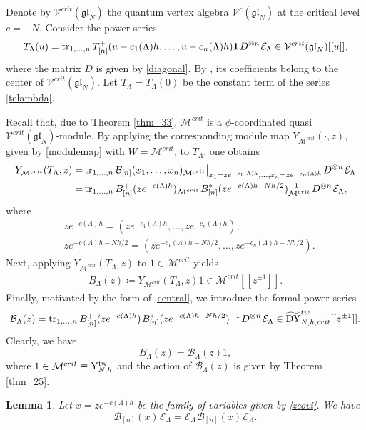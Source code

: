 \documentclass[12pt,a4paper,reqno]{amsart}
\theoremstyle{stil}
\theoremstyle{defi}
\theoremstyle{defi}
\theoremstyle{stil}
\theoremstyle{stil}
\newtheorem{lem}[thm]{Lemma}
\theoremstyle{stil}
\theoremstyle{prim}
\newcommand{\non}{\nonumber}
\newcommand{\beq}{\begin{equation}}
\newcommand{\eeq}{\end{equation}}
\newcommand{\ot}{\otimes}
\newcommand{\ts}{\hspace{1pt}}
\newcommand{\yhg}{{\rm Y}_{N,h}^{\text{tw}} }
\newcommand{\dyhocritt}{\widetilde{{\rm DY}}_{N,h,crit}^{tw} }
\newcommand{\Mccrit}{\mathcal{M}^{crit} }
\newcommand{\vac}{ \mathrm{\boldsymbol{1}}}
\newcommand{\Ec}{\mathcal{E}}
\newcommand{\tr}{ {\rm tr}}
\newcommand{\Vcdva}{\mathcal{V}^{c}(\mathfrak{gl}_N)}
\newcommand{\Vccrit}{\mathcal{V}^{crit}(\mathfrak{gl}_N)}
\newcommand{\bc}{\mathcal{B}}
\begin{document}
Denote by $\Vccrit$ the quantum   vertex algebra $\Vcdva$ at the critical level $c=-N$.
Consider the   power series
\beq\label{telambda}
T_\Lambda(u)=\tr_{1,\ldots ,n} \, T_{[n]}^+ (u -c_1(\Lambda)h,\ldots ,u -c_n(\Lambda)h)\vac \ts D^{\ot n}\ts \Ec_\Lambda \in \Vccrit[[u]],
\eeq
where the matrix $D$ is given by \eqref {diagonal}.
By \cite[Prop. 7.4]{BJK}, its coefficients belong to the center of $\Vccrit$. Let $T_\Lambda=T_\Lambda(0)$ be the constant term  of the series \eqref{telambda}.

Recall that, due to  Theorem \ref{thm_33}, $\Mccrit$ is a $\phi$-coordinated quasi $\Vccrit$-module. By applying the corresponding module map  $Y_{\Mccrit}(\cdot, z)$,  given by \eqref{modulemap} with $W=\Mccrit$,  to $T_\Lambda$, one obtains
\begin{align} 
 Y_{\Mccrit}(T_\Lambda , z) =  &\, \tr_{1,\ldots ,n} \, \bc_{[n]}(x_1, \ldots ,x_n )_{\Mccrit}\big|_{x_1=ze^{-c_1(\Lambda)h},\ldots ,x_n=ze^{-c_n(\Lambda)h}} \ts D^{\ot n}\ts \Ec_\Lambda\non\\
 = & \, \tr_{1,\ldots ,n} \, B^+_{[n]}(ze^{-c(\Lambda)h})_{\Mccrit} \ts B^*_{[n]}(ze^{-c(\Lambda)h -Nh/2})_{\Mccrit}^{-1}\ts D^{\ot n}\ts \Ec_\Lambda,\label{central}
\end{align}
where
\begin{align}
&ze^{-c(\Lambda)h}=
(ze^{-c_1(\Lambda)h}, \ldots ,ze^{-c_n(\Lambda)h}),\label{zeovi} \\
&ze^{-c(\Lambda)h-Nh/2}=
(ze^{-c_1(\Lambda)h-Nh/2}, \ldots ,ze^{-c_n(\Lambda)h-Nh/2}).\non
\end{align}
Next, applying $Y_{\Mccrit}(T_\Lambda , z)$ to $1\in \Mccrit$ yields
 \begin{align}\label{belambda_10}
 B_\Lambda(z)\coloneqq Y_{\Mccrit}(T_\Lambda , z)1  
  \in\Mccrit[[z^{\pm 1}]].
\end{align}
Finally, motivated by the form of \eqref{central}, we introduce the formal power series
$$
\mathcal{B}_\Lambda(z)=
\tr_{1,\ldots ,n} \, B^+_{[n]}(ze^{-c(\Lambda)h})  \ts B^*_{[n]}(ze^{-c(\Lambda)h -Nh/2})^{-1}\ts D^{\ot n}\ts \Ec_\Lambda\in \dyhocritt[[z^{\pm 1}]].
$$ 
Clearly, we have
\beq\label{blambdablambda}   
B_\Lambda(z) =\mathcal{B}_\Lambda(z)1 ,
\eeq
 where $1\in \Mccrit\equiv\yhg$ and the action of $\mathcal{B}_\Lambda(z)$  is given by Theorem \ref{thm_25}.  

 
\begin{lem} 
Let   $x=ze^{-c(\Lambda)h}$ be the family of variables given by \eqref{zeovi}. We have
\beq\label{bneccc}
\mathcal{B}_{[n]}(x)\ts\Ec_\Lambda =\Ec_\Lambda \ts \mathcal{B}_{[n]}(x)\ts\Ec_\Lambda .
\eeq
\end{lem}
\end{document}
